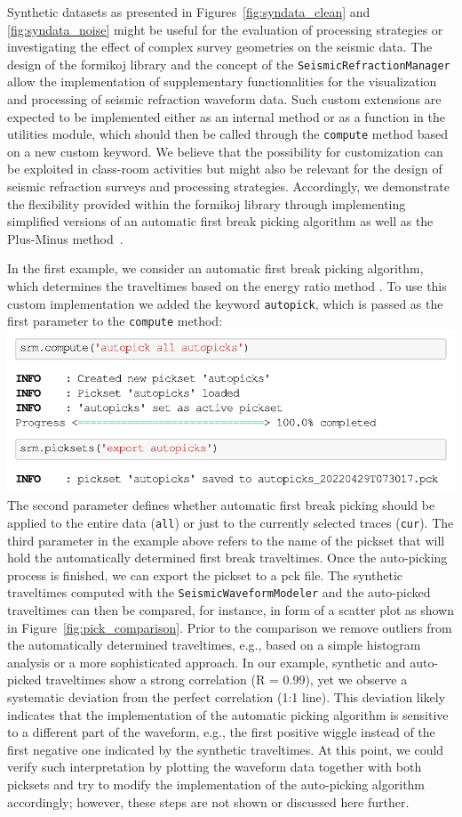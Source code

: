 \documentclass[a4paper,fleqn]{cas-sc}
\begin{document}
Synthetic datasets as presented in Figures~\ref{fig:syndata_clean} and \ref{fig:syndata_noise} might be useful for the evaluation of processing strategies or investigating the effect of complex survey geometries on the seismic data. The design of the formikoj library and the concept of the \texttt{SeismicRefractionManager} allow the implementation of supplementary functionalities for the visualization and processing of seismic refraction waveform data. 
Such custom extensions are expected to be implemented either as an internal method or as a function in the utilities module, which should then be called through the \texttt{compute} method based on a new custom keyword. We believe that the possibility for customization can be exploited in class-room activities but might also be relevant for the design of seismic refraction surveys and processing strategies. Accordingly, we demonstrate the flexibility provided within the formikoj library through implementing simplified versions of an automatic first break picking algorithm as well as the Plus-Minus method~\citep{hagedoorn1959}.

In the first example, we consider an automatic first break picking algorithm, which determines the traveltimes based on the energy ratio method \citep[e.g.,][]{earle1994}. To use this custom implementation we added the keyword \texttt{autopick}, which is passed as the first parameter to the \texttt{compute} method:
\newline
\includegraphics[width=.5\textwidth]{./figures/autopicking.pdf}
\newline
The second parameter defines whether automatic first break picking should be applied to the entire data (\texttt{all}) or just to the currently selected traces (\texttt{cur}). The third parameter in the example above refers to the name of the pickset that will hold the automatically determined first break traveltimes.
Once the auto-picking process is finished, we can export the pickset to a pck file.
The synthetic traveltimes computed with the \texttt{SeismicWaveformModeler} and the auto-picked traveltimes can then be compared, for instance, in form of a scatter plot as shown in Figure~\ref{fig:pick_comparison}. Prior to the comparison we remove outliers from the automatically determined traveltimes, e.g., based on a simple histogram analysis or a more sophisticated approach. In our example, synthetic and auto-picked traveltimes show a strong correlation (R = 0.99), yet we observe a systematic deviation from the perfect correlation (1:1 line). This deviation likely indicates that the implementation of the automatic picking algorithm is sensitive to a different part of the waveform, e.g., the first positive wiggle instead of the first negative one indicated by the synthetic traveltimes. At this point, we could verify such interpretation by plotting the waveform data together with both picksets and try to modify the implementation of the auto-picking algorithm accordingly; however, these steps are not shown or discussed here further.
\end{document}
